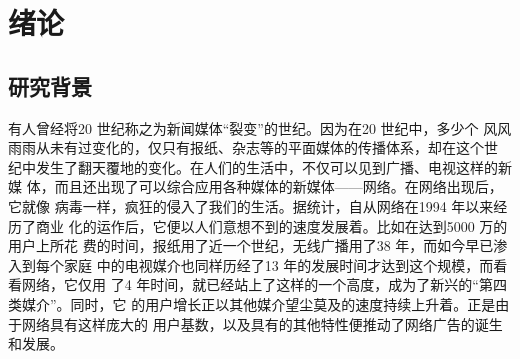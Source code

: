 \chapter{绪论}

\section{研究背景}

有人曾经将20 世纪称之为新闻媒体“裂变”的世纪。因为在20 世纪中，多少个
风风雨雨从未有过变化的，仅只有报纸、杂志等的平面媒体的传播体系，却在这个世
纪中发生了翻天覆地的变化。在人们的生活中，不仅可以见到广播、电视这样的新媒
体，而且还出现了可以综合应用各种媒体的新媒体——网络。在网络出现后，它就像
病毒一样，疯狂的侵入了我们的生活。据统计，自从网络在1994 年以来经历了商业
化的运作后，它便以人们意想不到的速度发展着。比如在达到5000 万的用户上所花
费的时间，报纸用了近一个世纪，无线广播用了38 年，而如今早已渗入到每个家庭
中的电视媒介也同样历经了13 年的发展时间才达到这个规模，而看看网络，它仅用
了4 年时间，就已经站上了这样的一个高度，成为了新兴的“第四类媒介”。同时，它
的用户增长正以其他媒介望尘莫及的速度持续上升着。正是由于网络具有这样庞大的
用户基数，以及具有的其他特性便推动了网络广告的诞生和发展。
